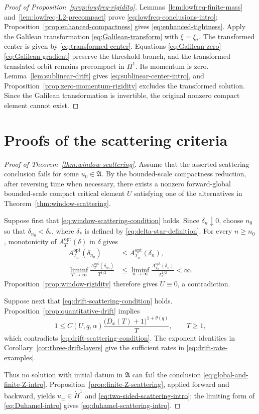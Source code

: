 \documentclass[preprint,12pt]{elsarticle}
\numberwithin{equation}{section}
\theoremstyle{remark}
\newcommand{\Aopt}{A^{\mathrm{opt}}}
\begin{document}
\begin{proof}[Proof of Proposition~\ref{prop:lowfreq-rigidity}]
Lemmas~\ref{lem:lowfreq-finite-mass} and~\ref{lem:lowfreq-L2-precompact} prove \eqref{eq:lowfreq-conclusions-intro}; Proposition~\ref{prop:enhanced-compactness} gives \eqref{eq:enhanced-tightness}. Apply the Galilean transformation \eqref{eq:Galilean-transform} with $\xi=\xi_*$. The transformed center is given by \eqref{eq:transformed-center}. Equations \eqref{eq:Galilean-zero}--\eqref{eq:Galilean-gradient} preserve the threshold branch, and the transformed translated orbit remains precompact in $H^1$. Its momentum is zero. Lemma~\ref{lem:sublinear-drift} gives \eqref{eq:sublinear-center-intro}, and Proposition~\ref{prop:zero-momentum-rigidity} excludes the transformed solution. Since the Galilean transformation is invertible, the original nonzero compact element cannot exist.
\end{proof}

\section{Proofs of the scattering criteria}

\begin{proof}[Proof of Theorem~\ref{thm:window-scattering}]
Assume that the asserted scattering conclusion fails for some $u_0\in\mathfrak A$. By the bounded-scale compactness reduction, after reversing time when necessary, there exists a nonzero forward-global bounded-scale compact critical element $U$ satisfying one of the alternatives in Theorem~\ref{thm:window-scattering}.

Suppose first that \eqref{eq:window-scattering-condition} holds. Since $\delta_n\downarrow0$, choose $n_0$ so that $\delta_{n_0}<\delta_*$, where $\delta_*$ is defined by \eqref{eq:delta-star-definition}. For every $n\ge n_0$, monotonicity of $\Aopt_T(\delta)$ in $\delta$ gives
\begin{align*}
  \Aopt_{T_n}(\delta_{n_0})
  &\le \Aopt_{T_n}(\delta_n),\\
  \liminf_{T\to\infty}
  \frac{\Aopt_T(\delta_{n_0})}{T^{1/2}}
  &\le \liminf_{n\to\infty}
  \frac{\Aopt_{T_n}(\delta_n)}{T_n^{1/2}}<\infty.
\end{align*}
Proposition~\ref{prop:window-rigidity} therefore gives $U\equiv0$, a contradiction.

Suppose next that \eqref{eq:drift-scattering-condition} holds. Proposition~\ref{prop:quantitative-drift} implies
\[
  1\le C(U,q,\alpha)
  \frac{\bigl(D_x(T)+1\bigr)^{1+\theta(q)}}{T},
  \qquad T\ge1,
\]
which contradicts \eqref{eq:drift-scattering-condition}. The exponent identities in Corollary~\ref{cor:three-drift-layers} give the sufficient rates in \eqref{eq:drift-rate-examples}.

Thus no solution with initial datum in $\mathfrak A$ can fail the conclusion \eqref{eq:global-and-finite-Z-intro}. Proposition~\ref{prop:finite-Z-scattering}, applied forward and backward, yields $u_\pm\in\dot H^1$ and \eqref{eq:two-sided-scattering-intro}; the limiting form of \eqref{eq:Duhamel-intro} gives \eqref{eq:duhamel-scattering-intro}.
\end{proof}
\end{document}

